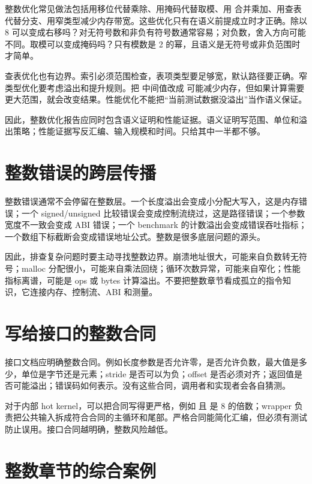 整数优化常见做法包括用移位代替乘除、用掩码代替取模、用  合并乘加、用查表代替分支、用窄类型减少内存带宽。这些优化只有在语义前提成立时才正确。除以 8 可以变成右移吗？对无符号数和非负有符号数通常容易；对负数，舍入方向可能不同。取模可以变成掩码吗？只有模数是 2 的幂，且语义是无符号或非负范围时才简单。

查表优化也有边界。索引必须范围检查，表项类型要足够宽，默认路径要正确。窄类型优化要考虑溢出和提升规则。把  中间值改成  可能减少内存，但如果计算需要更大范围，就会改变结果。性能优化不能把“当前测试数据没溢出”当作语义保证。

因此，整数优化报告应同时包含语义证明和性能证据。语义证明写范围、单位和溢出策略；性能证据写反汇编、输入规模和时间。只给其中一半都不够。

\section{整数错误的跨层传播}

整数错误通常不会停留在整数层。一个长度溢出会变成小分配大写入，这是内存错误；一个 signed/unsigned 比较错误会变成控制流绕过，这是路径错误；一个参数宽度不一致会变成 ABI 错误；一个 benchmark 的计数溢出会变成错误吞吐指标；一个数组下标截断会变成错误地址公式。整数是很多底层问题的源头。

因此，排查复杂问题时要主动寻找整数边界。崩溃地址很大，可能来自负数转无符号；malloc 分配很小，可能来自乘法回绕；循环次数异常，可能来自窄化；性能指标离谱，可能是 ops 或 bytes 计算溢出。不要把整数章节看成孤立的指令知识，它连接内存、控制流、ABI 和测量。

\section{写给接口的整数合同}

接口文档应明确整数合同。例如长度参数是否允许零，是否允许负数，最大值是多少，单位是字节还是元素；stride 是否可以为负；offset 是否必须对齐；返回值是否可能溢出；错误码如何表示。没有这些合同，调用者和实现者会各自猜测。

对于内部 hot kernel，可以把合同写得更严格，例如  且  是 8 的倍数；wrapper 负责把公共输入拆成符合合同的主循环和尾部。严格合同能简化汇编，但必须有测试防止误用。接口合同越明确，整数风险越低。

\section{整数章节的综合案例}

